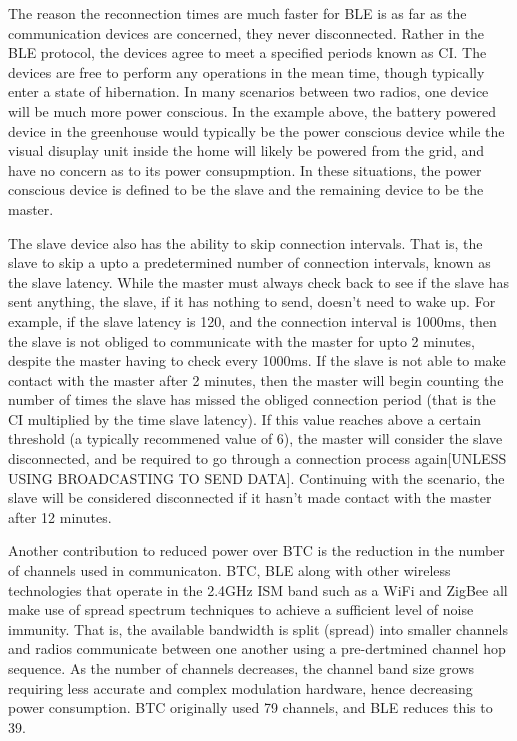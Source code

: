 \documentclass[]{article}
\begin{document}
The reason the reconnection times are much faster for \ac{BLE} is as far as the communication devices are concerned, they never disconnected. Rather in the \ac{BLE} protocol, the devices agree to meet a specified periods known as \ac{CI}. The devices are free to perform any operations in the mean time, though typically enter a state of hibernation. In many scenarios between two radios, one device will be much more power conscious. In the example above, the battery powered device in the greenhouse would typically be the power conscious device while the visual disuplay unit inside the home will likely be powered from the grid, and have no concern as to its power consupmption. In these situations, the power conscious device is defined to be the slave and the remaining device to be the master. 

The slave device also has the ability to skip connection intervals. That is, the slave to skip a upto a predetermined number of connection intervals, known as the slave latency. While the master must always check back to see if the slave has sent anything, the slave, if it has nothing to send, doesn't need to wake up. For example, if the slave latency is 120, and the connection interval is 1000ms, then the slave is not obliged to communicate with the master for upto 2 minutes, despite the master having to check every 1000ms. If the slave is not able to make contact with the master after 2 minutes, then the master will begin counting the number of times the slave has missed the obliged connection period (that is the \ac{CI} multiplied by the time slave latency). If this value reaches above a certain threshold (a typically recommened value of 6), the master will consider the slave disconnected, and be required to go through a connection process again[UNLESS USING BROADCASTING TO SEND DATA]. Continuing with the scenario, the slave will be considered disconnected if it hasn't made contact with the master after 12 minutes.

Another contribution to reduced power over \ac{BTC} is the reduction in the number of channels used in communicaton. \ac{BTC}, \ac{BLE} along with other wireless technologies that operate in the 2.4GHz ISM band such as a WiFi and ZigBee all make use of spread spectrum techniques to achieve a sufficient level of noise immunity. That is, the available bandwidth is split (spread) into smaller channels and radios communicate between one another using a pre-dertmined channel hop sequence. As the number of channels decreases, the channel band size grows requiring less accurate and complex modulation hardware, hence decreasing power consumption. \ac{BTC} originally used 79 channels, and \ac{BLE} reduces this to 39.
\end{document}
